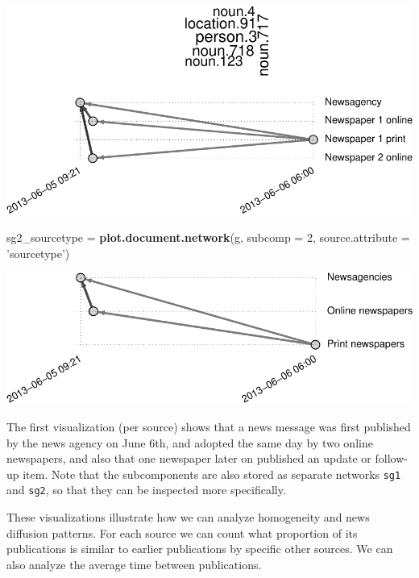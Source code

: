 \documentclass[]{article}
\newenvironment{Shaded}{\begin{snugshade}}{\end{snugshade}}
\newcommand{\KeywordTok}[1]{\textcolor[rgb]{0.13,0.29,0.53}{\textbf{{#1}}}}
\newcommand{\DataTypeTok}[1]{\textcolor[rgb]{0.13,0.29,0.53}{{#1}}}
\newcommand{\DecValTok}[1]{\textcolor[rgb]{0.00,0.00,0.81}{{#1}}}
\newcommand{\StringTok}[1]{\textcolor[rgb]{0.31,0.60,0.02}{{#1}}}
\newcommand{\NormalTok}[1]{{#1}}
\begin{document}
\includegraphics{vignette_files/figure-latex/unnamed-chunk-13-1.pdf}

\begin{Shaded}
\begin{Highlighting}[]
\NormalTok{sg2_sourcetype =}\StringTok{ }\KeywordTok{plot.document.network}\NormalTok{(g, }\DataTypeTok{subcomp =} \DecValTok{2}\NormalTok{, }\DataTypeTok{source.attribute =} \StringTok{'sourcetype'}\NormalTok{)}
\end{Highlighting}
\end{Shaded}

\includegraphics{vignette_files/figure-latex/unnamed-chunk-14-1.pdf}

The first visualization (per source) shows that a news message was first
published by the news agency on June 6th, and adopted the same day by
two online newspapers, and also that one newspaper later on published an
update or follow-up item. Note that the subcomponents are also stored as
separate networks \texttt{sg1} and \texttt{sg2}, so that they can be
inspected more specifically.

These visualizations illustrate how we can analyze homogeneity and news
diffusion patterns. For each source we can count what proportion of its
publications is similar to earlier publications by specific other
sources. We can also analyze the average time between publications.
\end{document}
